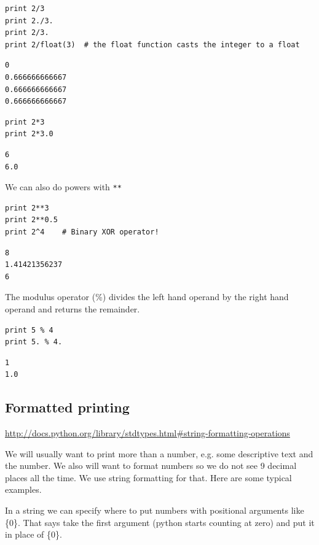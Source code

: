 \documentclass[11pt]{article}
\begin{document}
\begin{verbatim}
print 2/3
print 2./3.
print 2/3.
print 2/float(3)  # the float function casts the integer to a float
\end{verbatim}

\begin{verbatim}
0
0.666666666667
0.666666666667
0.666666666667
\end{verbatim}

\begin{verbatim}
print 2*3
print 2*3.0
\end{verbatim}

\begin{verbatim}
6
6.0
\end{verbatim}

We can also do powers with \texttt{**}

\begin{verbatim}
print 2**3
print 2**0.5
print 2^4    # Binary XOR operator!
\end{verbatim}

\begin{verbatim}
8
1.41421356237
6
\end{verbatim}

The modulus operator (\%) divides the left hand operand by the right hand operand and returns the remainder.

\begin{verbatim}
print 5 % 4
print 5. % 4.
\end{verbatim}

\begin{verbatim}
1
1.0
\end{verbatim}


\subsection{Formatted printing}
\label{sec:orgdc7d3f4}
\url{http://docs.python.org/library/stdtypes.html\#string-formatting-operations}

We will usually want to print more than a number, e.g. some descriptive text and the number. We also will want to format numbers so we do not see 9 decimal places all the time. We use string formatting for that. Here are some typical examples.

In a string we can specify where to put numbers with positional arguments like \{0\}. That says take the first argument (python starts counting at zero) and put it in place of \{0\}.
\end{document}
